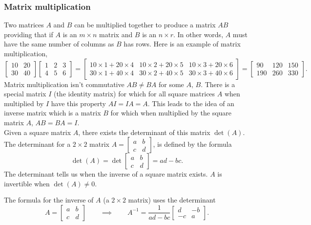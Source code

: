 \documentclass[10pt, a4paper]{article}
\begin{document}
\subsubsection{Matrix multiplication}
Two matrices $A$ and $B$ can be multiplied together to produce a matrix $AB$ providing that if $A$ is an $m\times n$ matrix and $B$ is an $n\times r$. In other words, $A$ must have the same number of columns as $B$ has rows. Here is an example of matrix multiplication,
\[
\begin{bmatrix}
    10 & 20 \\ 
    30 & 40
\end{bmatrix}
\begin{bmatrix}
    1 & 2 & 3 \\ 
    4 & 5 & 6
\end{bmatrix}
=
\begin{bmatrix}
    10 \times 1 + 20 \times 4 & 10 \times 2 + 20 \times 5 & 10 \times 3 + 20 \times 6 \\ 
    30 \times 1 + 40 \times 4 & 30 \times 2 + 40 \times 5 & 30 \times 3 + 40 \times 6
\end{bmatrix}
=
\begin{bmatrix}
    90 & 120 & 150 \\ 
    190 & 260 & 330
\end{bmatrix}.
\]
Matrix multiplication isn't commutative $AB \neq BA$ for some $A$, $B$. There is a special matrix $I$ (the identity matrix) for which for all square matrices $A$ when multiplied by $I$ have this property $AI = IA = A$. This leads to the idea of an inverse matrix which is a matrix $B$ for which when multiplied by the square matrix $A$, $AB = BA = I$. \\

Given a square matrix $A$, there exists the determinant of this matrix $\det (A)$. The determinant for a $2\times 2$ matrix $A = \begin{bmatrix} a & b \\ c & d \end{bmatrix}$, is defined by the formula
\[
\det (A) = \det \begin{bmatrix} a & b \\ c & d \end{bmatrix} = ad - bc.
\]
The determinant tells us when the inverse of a square matrix exists. $A$ is invertible when $\det (A) \neq 0$.

The formula for the inverse of $A$ (a $2\times 2$ matrix) uses the determinant
\[
A = \begin{bmatrix} a & b \\ c & d \end{bmatrix}\qquad\implies\qquad A ^ {-1} = \frac{1}{ad - bc}\begin{bmatrix} d & -b \\ -c & a \end{bmatrix}.
\]
\end{document}
